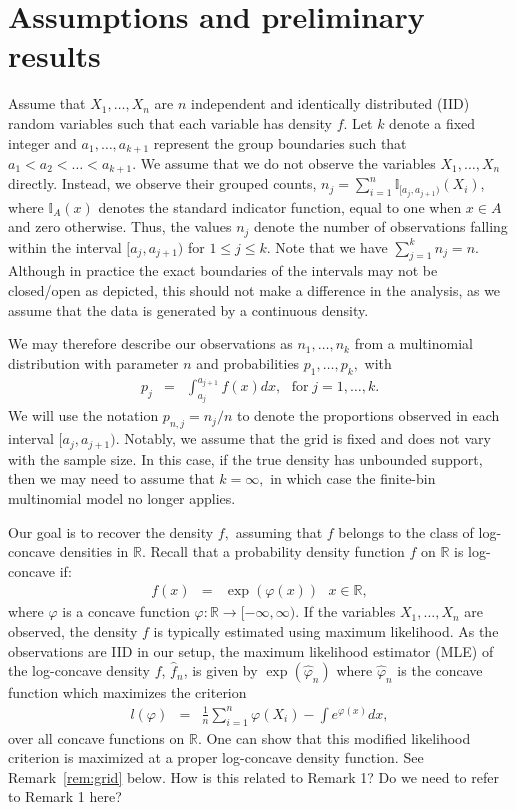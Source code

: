 \documentclass[12pt]{article} %
\newcommand{\comC}[1]{{\noindent  \color{orange}#1}}
\newcommand{\RR}{\mathbb {R}}
\begin{document}
\section{Assumptions and preliminary results}
\label{sec:methods}


   
Assume that $X_1, \ldots, X_n$ are $n$ independent and identically distributed (IID) random variables such that each variable has density $f$. Let $k$ denote a fixed integer and $a_1, \ldots, a_{k+1}$ represent the group boundaries such that $a_1 < a_2 < \ldots < a_{k+1}$.   We assume that we do not observe the variables $X_1, \ldots, X_n$ directly. Instead, we observe their grouped counts, $n_j= \sum_{i=1}^n \mathbb I_{[a_j, a_{j+1})}(X_i)$, where $\mathbb I_A(x)$ denotes the standard indicator function, equal to one when $x\in A$ and zero otherwise.   Thus, the values $n_j$ denote the number of observations falling within the interval $[a_j, a_{j+1})$ for $1 \leq j \leq k$. Note that we have $\sum_{j=1}^{k} n_j = n$.  Although in practice the exact boundaries of the intervals may not be closed/open as depicted, this should not make a difference in the analysis, as we assume that the data is generated by a continuous density. 

We may therefore describe our observations as $n_1, \ldots, n_{k}$ from a multinomial distribution with parameter $n$ and probabilities $p_1, \ldots, p_k,$ with 
\begin{eqnarray*}
p_j &=& \int_{a_j}^{a_{j+1}} f(x)dx, \ \ \ \mbox{for} \; j=1,\ldots, k.
\end{eqnarray*}
We will use the notation $p_{n,j}=n_j/n$ to denote the proportions observed in each interval $[a_j, a_{j+1})$.  Notably, we assume that the grid is fixed and does not vary with the sample size.  In this case, if the true density has unbounded support, then we may need to assume that $k=\infty,$ in which case the finite-bin multinomial model no longer applies. 

Our goal is to recover the density $f,$ assuming that $f$ belongs to the class of log-concave densities in $\RR$. Recall that a probability density function $f$ on $\mathbb{R} $ is log-concave  if:
\begin{eqnarray*}
f(x) &=& \exp(\varphi(x)) \ \ \ x\in \RR,
\end{eqnarray*}
where $\varphi$ is a concave function  $\varphi: \RR \to [-\infty, \infty)$.  If the variables $X_1, \ldots, X_n$ are observed, the density $f$ is typically estimated using maximum likelihood.  As the observations are IID in our setup, the maximum likelihood estimator (MLE) of the log-concave density $f$, $\widehat f_n$, is given by $\exp(\widehat \varphi_n)$ where $\widehat \varphi_n$ is the concave function which maximizes the criterion 
\begin{eqnarray*}
    l(\varphi) &=& \frac{1}{n} \sum_{i=1}^{n} \varphi(X_i) - \int e^{\varphi(x)} dx,
\end{eqnarray*}
over all concave functions on $\RR$.  One can show that this modified likelihood criterion is maximized at a proper log-concave density function. See Remark~\ref{rem:grid} below. \comC{How is this related to Remark 1? Do we need to refer to Remark 1 here?}
\end{document}
